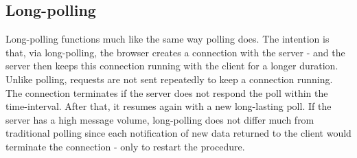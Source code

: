 \subsection{Long-polling}

Long-polling functions much like the same way polling does. The intention is 
that, via long-polling, the browser creates a connection with the server - 
and the server then keeps this connection running with the client for a 
longer duration\cite{lubbersgreco}. Unlike polling, requests are not sent 
repeatedly to keep a connection running\cite{lubbersgreco}. The connection 
terminates if the server does not respond the poll within the time-interval. 
After that, it resumes again with a new long-lasting poll\cite{lubbersgreco}. 
If the server has a high message volume, long-polling does not differ much 
from traditional polling since each notification of new data returned to the 
client would terminate the connection - only to restart the 
procedure\cite{lubbersgreco}.